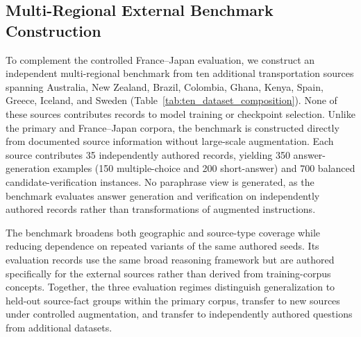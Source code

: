 \documentclass[a4paper,fleqn]{cas-sc}
\begin{document}
\subsection{Multi-Regional External Benchmark Construction}
\label{sec:multiregional-benchmark}

To complement the controlled France--Japan evaluation, we construct an independent multi-regional benchmark from ten additional transportation sources spanning Australia, New Zealand, Brazil, Colombia, Ghana, Kenya, Spain, Greece, Iceland, and Sweden (Table~\ref{tab:ten_dataset_composition}). None of these sources contributes records to model training or checkpoint selection. Unlike the primary and France--Japan corpora, the benchmark is constructed directly from documented source information without large-scale augmentation. Each source contributes 35 independently authored records, yielding 350 answer-generation examples (150 multiple-choice and 200 short-answer) and 700 balanced candidate-verification instances. No paraphrase view is generated, as the benchmark evaluates answer generation and verification on independently authored records rather than transformations of augmented instructions.

The benchmark broadens both geographic and source-type coverage while reducing dependence on repeated variants of the same authored seeds. Its evaluation records use the same broad reasoning framework but are authored specifically for the external sources rather than derived from training-corpus concepts. Together, the three evaluation regimes distinguish generalization to held-out source-fact groups within the primary corpus, transfer to new sources under controlled augmentation, and transfer to independently authored questions from additional datasets.
\end{document}
